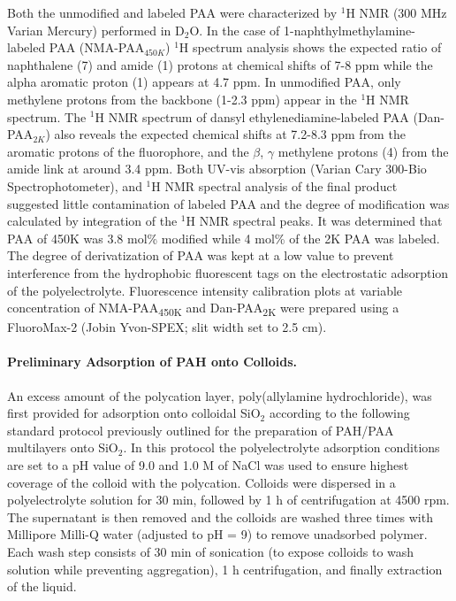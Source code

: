 \documentclass[twoside,twocolumn,9pt]{article}
\begin{document}
Both the unmodified and labeled PAA were characterized by $^{1}$H NMR (300 MHz Varian Mercury) performed in D$_2$O.  In the case of 1-naphthylmethylamine-labeled PAA (NMA-PAA$_{450K}$) $^1$H   spectrum analysis shows the expected ratio of naphthalene (7) and amide (1) protons at chemical shifts of 7-8 ppm while the alpha aromatic proton (1) appears at 4.7 ppm.  In unmodified PAA, only methylene protons from the backbone (1-2.3 ppm) appear in the $^1$H NMR spectrum.  The $^1$H NMR spectrum of dansyl ethylenediamine-labeled PAA (Dan-PAA$_{2K}$) also reveals the expected chemical shifts at 7.2-8.3 ppm from the aromatic protons of the fluorophore, and the $\beta$, $\gamma$ methylene protons (4) from the amide link at around 3.4 ppm.  Both UV-vis absorption (Varian Cary 300-Bio Spectrophotometer), and $^{1}$H NMR spectral analysis of the final product suggested little contamination of labeled PAA and the degree of modification was calculated by integration of the $^{1}$H NMR spectral peaks.  It was determined that PAA of 450K was 3.8 mol\% modified while 4 mol\% of the 2K PAA was labeled.  The degree of derivatization of PAA was kept at a low value to prevent interference from the hydrophobic fluorescent tags on the electrostatic adsorption of the polyelectrolyte.  Fluorescence intensity calibration plots at variable concentration of NMA-PAA\textsubscript{450K} and Dan-PAA\textsubscript{2K} were prepared using a FluoroMax-2 (Jobin Yvon-SPEX; slit width set to 2.5 cm). 

\paragraph{Preliminary Adsorption of PAH onto Colloids.}   %
    \label{sec-prelPAH}


An excess amount of the polycation layer, poly(allylamine hydrochloride), was first provided for adsorption onto colloidal SiO$_2$ according to the following standard protocol previously outlined for the preparation of PAH/PAA multilayers onto SiO$_2$.\cite{Burke2003}  In this protocol the polyelectrolyte adsorption conditions are set to a pH value of 9.0 and 1.0 M of NaCl was used to ensure highest coverage of the colloid with the polycation.  Colloids were dispersed in a polyelectrolyte solution for 30 min, followed by 1 h of centrifugation at 4500 rpm.  The supernatant is then removed and the colloids are washed three times with Millipore Milli-Q water (adjusted to pH = 9) to remove unadsorbed polymer.  Each wash step consists of 30 min of sonication (to expose colloids to wash solution while preventing aggregation), 1 h centrifugation, and finally extraction of the liquid.  
\end{document}
